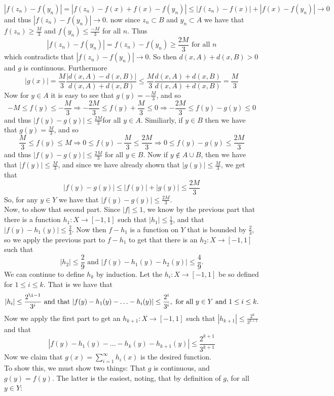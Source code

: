 \documentclass{article}
\begin{document}
\[
	|f(z_n)-f(y_n)| = |f(z_n)-f(x) + f(x)-f(y_n)| \leq |f(z_n)-f(x)|+|f(x)-f(y_n)| \to 0
\]
and thus $|f(z_n) - f(y_n)| \to 0$.  now since $z_n \subset B$ and $y_n \subset A$ we have that $f(z_n) \geq \frac{M}{3}$ and $f(y_n) \leq \frac{-M}{3}$ for all $n$.  Thus
\[
	|f(z_n) - f(y_n)| = f(z_n) - f(y_n) \geq \frac{2M}{3} \mbox{ for all } n
\]
which contradicts that $|f(z_n)-f(y_n)| \to 0$.  So then $d(x,A)+d(x,B) > 0$ and $g$ is continuous.  Furthermore
\[
	|g(x)| = \frac{M}{3}\frac{|d(x,A) - d(x,B)|}{d(x,A)+d(x,B)} \leq \frac{M}{3} \frac{d(x,A)+d(x,B)}{d(x,A)+d(x,B)} = \frac{M}{3}
\]
Now for $y \in A$ it is easy to see that $g(y) = -\frac{M}{3}$, and so
\[
	 -M \leq f(y) \leq -\frac{M}{3} \Rightarrow -\frac{2M}{3} \leq f(y) +\frac{M}{3} \leq 0 \Rightarrow -\frac{2M}{3} \leq f(y) - g(y) \leq 0
\]
and thus $|f(y) - g(y)| \leq \frac{2M}{3}$for all $y \in A$.  Similiarly, if $y \in B$ then we have that $g(y) = \frac{M}{3}$, and so
\[
	\frac{M}{3} \leq f(y) \leq M \Rightarrow 0 \leq f(y) - \frac{M}{3} \leq \frac{2M}{3} \Rightarrow 0 \leq f(y) - g(y) \leq \frac{2M}{3}
\]
and thus $|f(y) -g(y)| \leq \frac{2M}{3}$ for all $y \in B$.  Now if $y \notin A \cup B$, then we have that $|f(y)|\leq \frac{M}{3}$, and since we have already shown that $|g(y)|\leq \frac{M}{3}$, we get that
\[
	|f(y) - g(y)| \leq |f(y)| + |g(y)| \leq \frac{2M}{3}
\]
So, for any $y \in Y$ we have that $|f(y) - g(y)| \leq \frac{2M}{3}$.\\
Now, to show that second part.  Since $|f| \leq 1$, we know by the previous part that there is a function $h_1:X \to [-1,1]$ such that $|h_1| \leq \frac{1}{3}$, and that $|f(y)-h_1(y)| \leq \frac{2}{3}$.  Now then $f-h_1$ is a function on $Y$ that is bounded by $\frac{2}{3}$, so we apply the previous part to $f-h_1$ to get that there is an $h_2:X \to [-1,1]$ such that 
\[
	|h_2| \leq \frac{2}{9} \mbox{ and } |f(y)-h_1(y)-h_2(y)| \leq \frac{4}{9}. 
\]
We can continue to define $h_k$ by induction.  Let the $h_i:X \to [-1,1]$ be so defined for $1 \leq i \leq k$.  That is we have that 
\[
	|h_i| \leq \frac{2^{\i-1}}{3^i}\mbox{ and that } |f(y) - h_1(y) - \ldots - h_i(y)| \leq \frac{2^i}{3^i}, \mbox{ for all } y \in Y \mbox{ and } 1\leq i \leq k.
\]
Now we apply the first part to get an $h_{k+1} : X \to [-1,1]$ such that $|h_{k+1}| \leq \frac{2^k}{3^{k+1}}$ and that
\[
	 |f(y) - h_1(y) - \ldots - h_k(y) - h_{k+1}(y)| \leq \frac{2^{k+1}}{3^{k+1}}
\]
Now we claim that $g(x) = \sum_{i=1}^\infty h_i(x)$ is the desired function.\\
To show this, we must show two things: That $g$ is continuous, and $g(y) = f(y)$.  The latter is the easiest, noting, that by definition of $g$, for all $y \in Y$:
\end{document}
